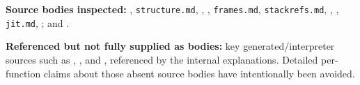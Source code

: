 \documentclass[
  11pt,
]{report}
\newcommand{\passthrough}[1]{#1}
\begin{document}
\textbf{Source bodies inspected:}
,
\passthrough{\lstinline!structure.md!},
,
,
\passthrough{\lstinline!frames.md!},
\passthrough{\lstinline!stackrefs.md!},
,
,
\passthrough{\lstinline!jit.md!},
;
 and
.

\textbf{Referenced but not fully supplied as bodies:} key
generated/interpreter sources such as
,
, and
, referenced by the internal
explanations. Detailed per-function claims about those absent source
bodies have intentionally been avoided.
\end{document}
